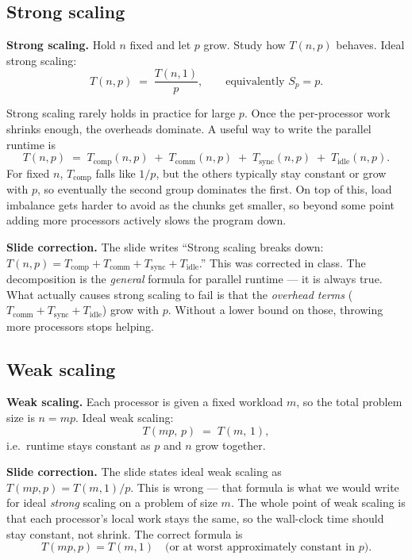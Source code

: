 \subsection{Strong scaling}

\begin{ppdefn}
\textbf{Strong scaling.}
Hold $n$ fixed and let $p$ grow. Study how $T(n,p)$ behaves.
Ideal strong scaling:
\[
T(n,p) \;=\; \frac{T(n,1)}{p}, \qquad \text{equivalently } S_p = p.
\]
\end{ppdefn}

Strong scaling rarely holds in practice for large $p$. Once the
per-processor work shrinks enough, the overheads dominate. A useful way to
write the parallel runtime is
\[
T(n,p) \;=\; T_{\text{comp}}(n,p) \;+\; T_{\text{comm}}(n,p) \;+\; T_{\text{sync}}(n,p) \;+\; T_{\text{idle}}(n,p).
\]
For fixed $n$, $T_{\text{comp}}$ falls like $1/p$, but the others typically
stay constant or grow with $p$, so eventually the second group dominates the
first. On top of this, load imbalance gets harder to avoid as the chunks get
smaller, so beyond some point adding more processors actively slows the
program down.

\begin{pppitfall}
\textbf{Slide correction.} The slide writes ``Strong scaling breaks down:
$T(n,p) = T_{\text{comp}} + T_{\text{comm}} + T_{\text{sync}} + T_{\text{idle}}$.''
This was corrected in class. The decomposition is the \emph{general} formula
for parallel runtime --- it is always true. What actually causes strong
scaling to fail is that the \emph{overhead terms}
($T_{\text{comm}} + T_{\text{sync}} + T_{\text{idle}}$) grow with $p$.
Without a lower bound on those, throwing more processors stops helping.
\end{pppitfall}

\subsection{Weak scaling}

\begin{ppdefn}
\textbf{Weak scaling.}
Each processor is given a fixed workload $m$, so the total problem size is
$n = mp$. Ideal weak scaling:
\[
T(mp,\,p) \;=\; T(m,\,1),
\]
i.e.\ runtime stays constant as $p$ and $n$ grow together.
\end{ppdefn}

\begin{pppitfall}
\textbf{Slide correction.} The slide states ideal weak scaling as
$T(mp, p) = T(m,1)/p$. This is wrong --- that formula is what we would
write for ideal \emph{strong} scaling on a problem of size $m$. The whole
point of weak scaling is that each processor's local work stays the same,
so the wall-clock time should stay constant, not shrink. The correct
formula is
\[
T(mp,p) = T(m,1) \quad\text{(or at worst approximately constant in $p$).}
\]
\end{pppitfall}

